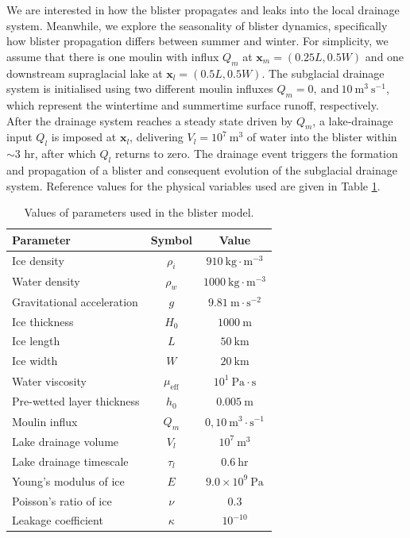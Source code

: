 \documentclass[draft]{agujournal2019}
\newcommand{\tabref}[1]{Table \ref{#1}}
\begin{document}
We are interested in how the blister propagates and leaks into the local drainage system. Meanwhile, we explore the seasonality of blister dynamics, specifically how blister propagation differs between summer and winter. For simplicity, we assume that there is one moulin with influx $Q_m$ at $\boldsymbol{x}_m=(0.25L,0.5W)$ and one downstream supraglacial lake at $\boldsymbol{x}_l=(0.5L,0.5W)$. The subglacial drainage system is initialised using two different moulin influxes $Q_m=0,~\text{and}~10~\text{m}^3~\text{s}^{-1}$, which represent the wintertime and summertime surface runoff, respectively. After the drainage system reaches a steady state driven by $Q_m$, a lake-drainage input $Q_l$ is imposed at $\boldsymbol{x}_l$, delivering $V_l=10^{7}~\text{m}^3$ of water into the blister within $\sim3$ hr, after which $Q_l$ returns to zero. The drainage event triggers the formation and propagation of a blister and consequent evolution of the subglacial drainage system. Reference values for the physical variables used are given in \tabref{tab:parameters}.

\begin{table}[htbp]
    \centering
    \caption{Values of parameters used in the blister model.}
    \begin{tabular}{lcc}
        \hline
        Parameter & Symbol & Value \\   
        \hline
        Ice density & $\rho_i$ & $910~\text{kg}\cdot\text{m}^{-3}$ \\
        Water density & $\rho_w$ & $1000~\text{kg}\cdot\text{m}^{-3}$ \\
        Gravitational acceleration & $g$ & $9.81~\text{m}\cdot\text{s}^{-2}$ \\
        Ice thickness & $H_0$ & $1000~\text{m}$ \\
        Ice length & $L$ & $50~\text{km}$ \\
        Ice width & $W$ & $20~\text{km}$ \\
        Water viscosity & $\mu_{\text{eff}}$ & $10^{1}~\text{Pa}\cdot\text{s}$ \\
        Pre-wetted layer thickness & $h_0$ & $0.005~\text{m}$ \\
        Moulin influx & $Q_m$ & $0,10~\text{m}^3\cdot\text{s}^{-1}$ \\
        Lake drainage volume & $V_l$ & $10^{7}~\text{m}^3$ \\
        Lake drainage timescale & $\tau_l$ & $0.6~\text{hr}$ \\
        Young's modulus of ice & $E$ & $9.0\times10^{9}~\text{Pa}$ \\
        Poisson's ratio of ice & $\nu$ & $0.3$ \\
        Leakage coefficient & $\kappa$ & $10^{-10}$\\
        \hline    
    \end{tabular}
    \label{tab:parameters}
\end{table}
\end{document}
